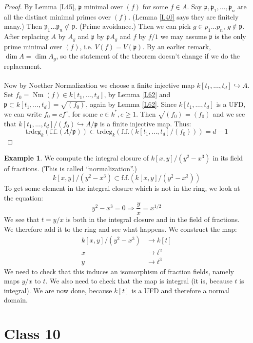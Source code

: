 \documentclass{article}
\newcommand{\fr}{\mathfrak}
\DeclareMathOperator{\Nm}{Nm}
\theoremstyle{plain}
\theoremstyle{definition}
\newtheorem{exmp}{Example}
\theoremstyle{remark}
\begin{document}
\begin{proof}
By Lemma \ref{L45}, $\fr p$ minimal over $(f)$ for some $f\in A$. Say $\fr p, \fr p_1, \dots, \fr p_n$ are all the distinct minimal primes over $(f)$. (Lemma \ref{L40} says they are finitely many.) Then $\fr p_1 \dots \fr p_n \not \subset \fr p$. (Prime avoidance.) Then we can pick $g\in p_1 \dots p_n$, $g\not \in \fr p$. After replacing $A$ by $A_g$ and $\fr p$ by $\fr p A_g$ and $f$ by $f/1$ we may assume $\fr p$ is the only prime minimal over $(f)$, i.e. $V(f) = V(\fr p)$. By an earlier remark, $\dim A = \dim A_g$, so the statement of the theorem doesn't change if we do the replacement. 
\\
\\
Now by Noether Normalization we choose a finite injective map $k[t_1, \dots, t_d] \hookrightarrow A$. Set $f_0 = \Nm(f) \in k[t_1, \dots, t_d]$, by Lemma \ref{L62} and $\fr p \subset k[t_1, \dots, t_d] = \sqrt{(f_0)}$, again by Lemma \ref{L62}. Since $k[t_1, \dots, t_d]$ is a UFD, we can write $f_0 = cf^e$, for some $c\in k^*, e\geq 1$. Then $\sqrt{(f_0)} = (f_0)$ and we see that $k[t_1, \dots, t_d]/(f_0) \hookrightarrow A/\fr p$ is a finite injective map. Thus:
\[       \text{trdeg}_k (\text{f.f.} (A/\fr p)) \subset \text{trdeg}_k (\text{f.f.} (k[t_1, \dots, t_d]/(f_0))) = d-1    \]
\end{proof}

\begin{exmp}
We compute the integral closure of $k[x,y]/(y^2 - x^3)$ in its field of fractions. (This is called ``normalization''.)
\[       k[x,y]/(y^2 - x^3) \subset \text{f.f.} (k[x,y]/(y^2 - x^3))    \]
To get some element in the integral closure which is not in the ring, we look at the equation:
\[       y^2 - x^3 = 0 \Rightarrow \frac{y}{x} = x^{1/2}    \]
We see that $t = y/x$ is both in the integral closure and in the field of fractions. We therefore add it to the ring and see what happens. We construct the map:
\begin{align*}      k[x,y]/(y^2 - x^3) &\to k[t] \\
x &\to t^2 \\
y &\to t^3
\end{align*}
We need to check that this induces an isomorphism of fraction fields, namely maps $y/x$ to $t$. We also need to check that the map is integral (it is, because $t$ is integral). We are now done, because $k[t]$ is a UFD and therefore a normal domain.
\end{exmp}

\section*{Class 10}
\end{document}
